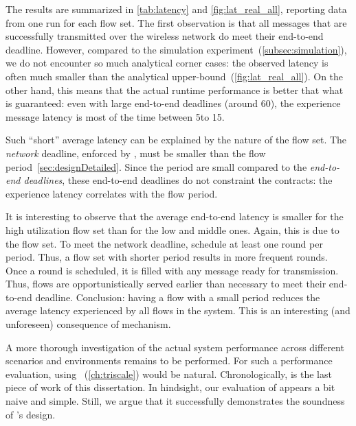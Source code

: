 The results are summarized in \cref{tab:latency} and \cref{fig:lat_real_all}, reporting data from one run for each flow set.
The first observation is that all messages that are successfully transmitted over the wireless network do meet their end-to-end deadline.
However, compared to the simulation experiment~(\cref{subsec:simulation}), we do not encounter so much analytical corner cases: the observed latency is often much smaller than the analytical upper-bound~(\cref{fig:lat_real_all}).
On the other hand, this means that the actual runtime performance is better that what is guaranteed: even with large end-to-end deadlines (around 60\s), the experience message latency is most of the time between 5\s to 15\s.

Such ``short'' average latency can be explained by the nature of the flow set. The \emph{network} deadline, enforced by \blink, must be smaller than the flow period~\cref{sec:designDetailed}. Since the period are small compared to the \emph{end-to-end deadlines}, these end-to-end deadlines do not constraint the \DRP contracts: the experience latency correlates with the flow period.

It is interesting to observe that the average end-to-end latency is smaller for the high utilization flow set than for the low and middle ones. Again, this is due to the flow set. To meet the network deadline, \blink schedule at least one round per period. Thus, a flow set with shorter period results in more frequent rounds. Once a round is scheduled, it is filled with any message ready for transmission. Thus, flows are opportunistically served earlier than necessary to meet their end-to-end deadline. Conclusion: having a flow with a small period reduces the average latency experienced by all flows in the system. This is an interesting (and unforeseen) consequence of \DRP mechanism.


A more thorough investigation of the actual system performance across different scenarios and environments remains to be performed.
For such a performance evaluation, using \triscale~(\cref{ch:triscale}) would be natural.
%
Chronologically, \triscale is the last piece of work of this dissertation. In hindsight, our evaluation of \DRP appears a bit naive and simple. Still, we argue that it successfully demonstrates the soundness of \DRP's design.%
